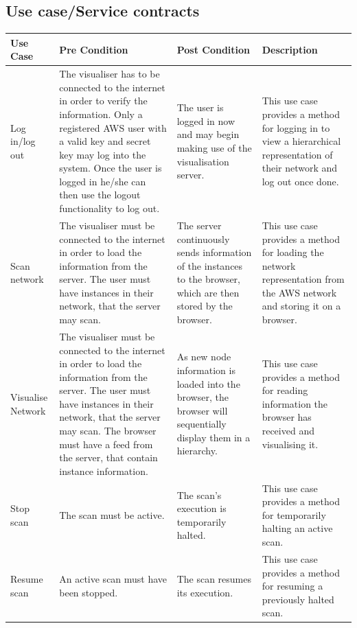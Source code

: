 \documentclass[a4paper,12pt]{report}
\begin{document}
\subsection{Use case/Service contracts}
\begin{center}
  \begin{longtable}{| p{3cm} | p{4cm} | p{4cm} | p{4cm} |}
    \hline
    Use Case & Pre Condition & Post Condition & Description \\ 
    \hline \hline
    Log in/log out & The visualiser has to be connected to the internet in order to verify the information. Only a registered AWS user with a valid key and secret key may log into the system. Once the user is logged in he/she can then use the logout functionality to log out. & The user is logged in now and may begin making use of the visualisation server. & This use case provides a method for logging in to view a hierarchical representation of their network and log out once done.\\ 
    \hline
    Scan network & The visualiser must be connected to the internet in order to load the information from the server. The user must have instances in their network, that the server may scan. & The server continuously sends information of the instances to the browser, which are then stored by the browser. & This use case provides a method for loading the network representation from the AWS network and storing it on a browser. \\ 
    \hline
    Visualise Network &  The visualiser must be connected to the internet in order to load the information from the server. The user must have instances in their network, that the server may scan. The browser must have a feed from the server, that contain instance information. & As new node information is loaded into the browser, the browser will sequentially display them in a hierarchy.  &  This use case provides a method for reading information the browser has received and visualising it.\\ 
    \hline
    Stop scan & The scan must be active. & The scan's execution is temporarily halted.  & This use case provides a method for temporarily halting an active scan.\\ \hline
    Resume scan & An active scan must have been stopped. & The scan resumes its execution. &  This use case provides a method for resuming a previously halted scan.\\ 
    \hline
    

\end{longtable}
\end{center}
\end{document}
